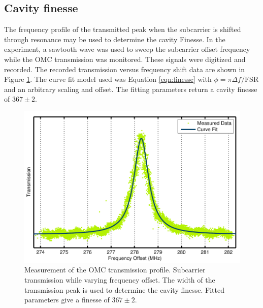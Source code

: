 \subsection{Cavity finesse}
The frequency profile of the transmitted peak when the subcarrier is shifted through resonance may be used to determine the cavity Finesse. %
In the experiment, a sawtooth wave was used to sweep the subcarrier offset frequency while the OMC transmission was monitored. %
These signals were digitized and recorded. %
The recorded transmission versus frequency shift data are shown in Figure \ref{fig:finesseFit}. %
The curve fit model used was Equation \ref{eqn:finesse} with $\phi=\pi \Delta f/\mathrm{FSR}$ and an arbitrary scaling and offset. %
The fitting parameters return a cavity finesse of $367\pm2$.
\begin{figure}
  \begin{center}
  \leavevmode
  \includegraphics{figs-omc/finesseFit.pdf}
  \end{center}
  \caption[Measurement of the OMC transmission profile.]{Measurement of the OMC transmission profile. Subcarrier transmission while varying frequency offset. The width of the transmission peak is used to determine the cavity finesse. Fitted parameters give a finesse of $367\pm2$.}
  \label{fig:finesseFit}
\end{figure}

